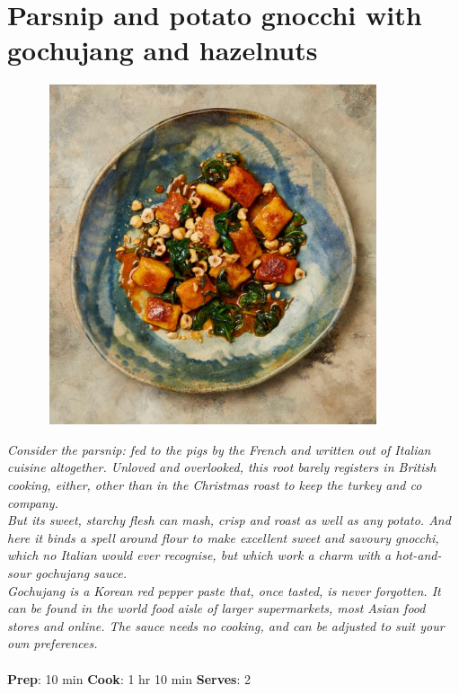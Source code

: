 \documentclass{book}
\begin{document}
\section{Parsnip and potato gnocchi with gochujang and hazelnuts}
\begin{figure}
\centering\includegraphics[width=10cm,height=10cm,keepaspectratio]{Recipe_Pictures/Parsnip_and_potato_gnocchi_with_gochujang_and_hazelnuts.png}
\end{figure}
\emph{Consider the parsnip: fed to the pigs by the French and written out of Italian cuisine altogether. Unloved and overlooked, this root barely registers in British cooking, either, other than in the Christmas roast to keep the turkey and co company.\\ 
But its sweet, starchy flesh can mash, crisp and roast as well as any potato. And here it binds a spell around flour to make excellent sweet and savoury gnocchi, which no Italian would ever recognise, but which work a charm with a hot-and-sour gochujang sauce.\\ 
Gochujang is a Korean red pepper paste that, once tasted, is never forgotten. It can be found in the world food aisle of larger supermarkets, most Asian food stores and online. The sauce needs no cooking, and can be adjusted to suit your own preferences.}\\\\ 
\textbf{Prep}: 10 min
\textbf{Cook}: 1 hr 10 min
\textbf{Serves}: 2
\end{document}

